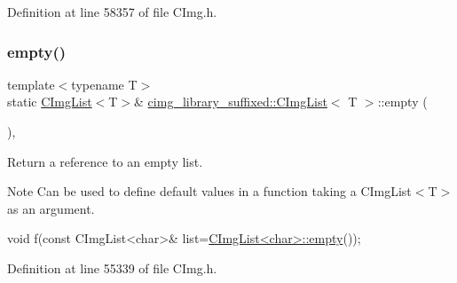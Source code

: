 Definition at line 58357 of file C\+Img.\+h.

\mbox{\label{structcimg__library__suffixed_1_1CImgList_afa0892dccfa1637ad92f7f453ad747ae}} 
\subsubsection{\texorpdfstring{empty()}{empty()}}
{\footnotesize\ttfamily template$<$typename T$>$ \\
static \hyperlink{structcimg__library__suffixed_1_1CImgList}{C\+Img\+List}$<$T$>$\& \hyperlink{structcimg__library__suffixed_1_1CImgList}{cimg\+\_\+library\+\_\+suffixed\+::\+C\+Img\+List}$<$ T $>$\+::empty (\begin{DoxyParamCaption}{ }\end{DoxyParamCaption})\hspace{0.3cm}{\ttfamily [inline]}, {\ttfamily [static]}}



Return a reference to an empty list. 

\begin{DoxyNote}{Note}
Can be used to define default values in a function taking a C\+Img\+List$<$\+T$>$ as an argument. 
\begin{DoxyCode}
\textcolor{keywordtype}{void} f(\textcolor{keyword}{const} CImgList<char>& list=\hyperlink{structcimg__library__suffixed_1_1CImgList_afa0892dccfa1637ad92f7f453ad747ae}{CImgList<char>::empty}());
\end{DoxyCode}
 
\end{DoxyNote}


Definition at line 55339 of file C\+Img.\+h.

\mbox{\label{structcimg__library__suffixed_1_1CImgList_afe6ef571f05f34f26f73eb02c9464d07}} 
